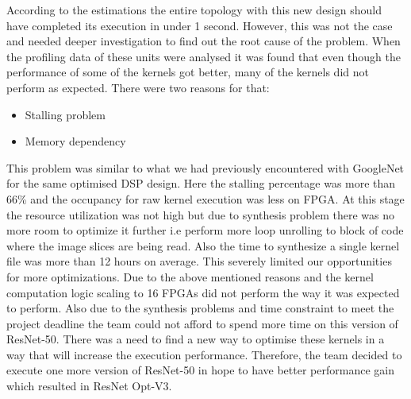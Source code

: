 According to the estimations the entire topology with this new design should have completed its execution in under 1 second. However, this was not the case and needed deeper investigation to find out the root cause of the problem. When the profiling data of these units were analysed it was found that even though the performance of some of the kernels got better, many of the kernels did not perform as expected. There were two reasons for that:
\begin{itemize}
    \item Stalling problem 
    \item Memory dependency
\end{itemize}
This problem was similar to what we had previously encountered with GoogleNet for the same optimised DSP design. Here the stalling percentage was more than 66\% and the occupancy for raw kernel execution was less on FPGA. At this stage the resource utilization was not high but due to synthesis problem there was no more room to optimize it further i.e perform more loop unrolling to block of code where the image slices are being read. Also the time to synthesize a single kernel file was more than 12 hours on average. This severely limited our opportunities for more optimizations. 
\newline
Due to the above mentioned reasons and the kernel computation logic scaling to 16 FPGAs did not perform the way it was expected to perform. Also due to the synthesis problems and time constraint to meet the project deadline the team could not afford to spend more time on this version of ResNet-50. There was a need to find a new way to optimise these kernels in a way that will increase the execution performance. Therefore, the team decided to execute one more version of ResNet-50 in hope to have better performance gain which resulted in ResNet Opt-V3.
